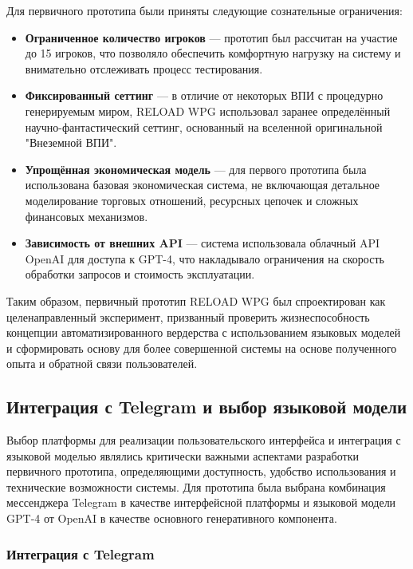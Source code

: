 Для первичного прототипа были приняты следующие сознательные ограничения:

\begin{itemize}
    \item \textbf{Ограниченное количество игроков} — прототип был рассчитан на участие до 15 игроков, что позволяло обеспечить комфортную нагрузку на систему и внимательно отслеживать процесс тестирования.

    \item \textbf{Фиксированный сеттинг} — в отличие от некоторых ВПИ с процедурно генерируемым миром, RELOAD WPG использовал заранее определённый научно-фантастический сеттинг, основанный на вселенной оригинальной "Внеземной ВПИ".

    \item \textbf{Упрощённая экономическая модель} — для первого прототипа была использована базовая экономическая система, не включающая детальное моделирование торговых отношений, ресурсных цепочек и сложных финансовых механизмов.

    \item \textbf{Зависимость от внешних API} — система использовала облачный API OpenAI для доступа к GPT-4, что накладывало ограничения на скорость обработки запросов и стоимость эксплуатации.
\end{itemize}

Таким образом, первичный прототип RELOAD WPG был спроектирован как целенаправленный эксперимент, призванный проверить жизнеспособность концепции автоматизированного вердерства с использованием языковых моделей и сформировать основу для более совершенной системы на основе полученного опыта и обратной связи пользователей.

\subsection{Интеграция с Telegram и выбор языковой модели}

Выбор платформы для реализации пользовательского интерфейса и интеграция с языковой моделью являлись критически важными аспектами разработки первичного прототипа, определяющими доступность, удобство использования и технические возможности системы. Для прототипа была выбрана комбинация мессенджера Telegram в качестве интерфейсной платформы и языковой модели GPT-4 от OpenAI в качестве основного генеративного компонента.

\subsubsection{Интеграция с Telegram}

